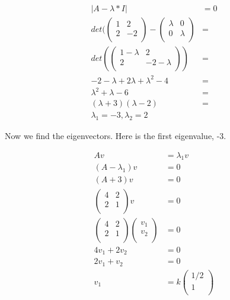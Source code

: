 \documentclass[
]{article}
\begin{document}
\begin{align*}
|A - \lambda * I| &= 0\\
det(\begin{pmatrix}
1 & 2 \\
2 & -2 \\
\end{pmatrix} - \begin{pmatrix}
\lambda & 0 \\
0 & \lambda \\
\end{pmatrix} &= \\
det(\begin{pmatrix}
1 - \lambda & 2 \\
2 & -2 - \lambda \\
\end{pmatrix}) &= \\
-2 - \lambda + 2\lambda + \lambda^2 - 4 &= \\
\lambda^2 + \lambda - 6 &= \\ 
(\lambda + 3)(\lambda - 2) &= \\
\lambda_1 = -3, \lambda_2 = 2
\end{align*}

Now we find the eigenvectors. Here is the first eigenvalue, -3.

\begin{align*}
Av &= \lambda_1v \\
(A - \lambda_1)v &= 0 \\
(A + 3)v &= 0 \\
\begin{pmatrix}
4 & 2 \\
2 & 1 \\
\end{pmatrix} v &= 0 \\
\begin{pmatrix}
4 & 2 \\
2 & 1 \\
\end{pmatrix} \begin{pmatrix}
v_1 \\
v_2 \\
\end{pmatrix} &= 0 \\

4v_1 + 2v_2 &= 0 \\
2v_1 + v_2 &= 0 \\

v_1 &= k \begin{pmatrix}
1/2 \\
1 \\
\end{pmatrix}
\end{align*}
\end{document}

